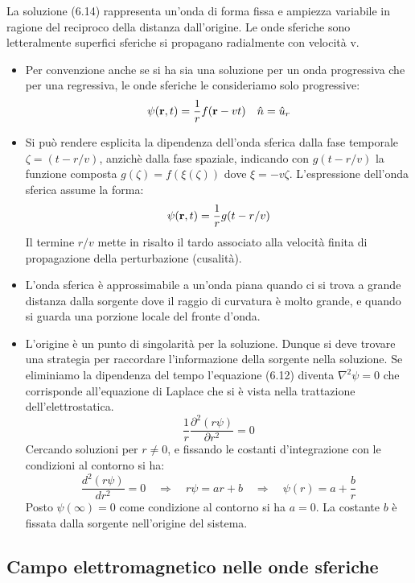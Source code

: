 La soluzione (6.14) rappresenta un'onda di forma fissa e ampiezza variabile in ragione del reciproco della distanza dall'origine. Le onde sferiche sono letteralmente superfici sferiche si propagano radialmente con velocit\`a v.
\begin{itemize}
\item Per convenzione anche se si ha sia una soluzione per un onda progressiva che per una regressiva, le onde sferiche le consideriamo solo progressive:
\begin{equation*}
	\psi(\bold{r},t) = \frac{1}{r}f(\bold{r}-vt) \quad \hat{n} = \hat{u}_{r}
\end{equation*}
\item Si pu\`o rendere esplicita la dipendenza dell'onda sferica dalla fase temporale $\zeta = (t-r/v)$, anzich\`e dalla fase spaziale, indicando con $g(t-r/v)$ la funzione composta $g(\zeta) = f(\xi(\zeta))$ dove $\xi = -v\zeta$. L'espressione dell'onda sferica assume la forma:
\begin{equation*}
	\psi(\bold{r},t) = \frac{1}{r}g(t-r/v)
\end{equation*}
Il termine $r/v$ mette in risalto il tardo associato alla velocit\`a finita di propagazione della perturbazione (cusalit\`a).
\item L'onda sferica \`e approssimabile a un'onda piana quando ci si trova a grande distanza dalla sorgente dove il raggio di curvatura \`e molto grande, e quando si guarda una porzione locale del fronte d'onda.
\item L'origine \`e un punto di singolarit\`a per la soluzione. Dunque si deve trovare una strategia per raccordare l'informazione della sorgente nella soluzione. Se eliminiamo la dipendenza del tempo l'equazione (6.12) diventa $\nabla^2 \psi = 0$ che corrisponde all'equazione di Laplace che si \`e vista nella trattazione dell'elettrostatica.
\begin{equation*}
	\frac{1}{r} \frac{\partial^2(r \psi)}{\partial r^2} = 0
\end{equation*}
Cercando soluzioni per $r \neq 0$, e fissando le costanti d'integrazione con le condizioni al contorno si ha:
\begin{equation*}
	\frac{d^2 (r \psi)}{d r^2} = 0 \quad \Rightarrow \quad r\psi = ar+b \quad \Rightarrow \quad \psi(r) = a + \frac{b}{r}
\end{equation*}
Posto $\psi(\infty) = 0 $ come condizione al contorno si ha $a = 0$. La costante $b$ \`e fissata dalla sorgente nell'origine del sistema.

\end{itemize}

\subsection{Campo elettromagnetico nelle onde sferiche}


